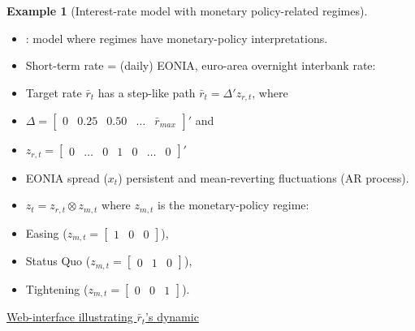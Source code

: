 \documentclass[
  12pt,
]{book}
\providecommand{\tightlist}{%
  \setlength{\itemsep}{0pt}\setlength{\parskip}{0pt}}
\theoremstyle{definition}
\theoremstyle{definition}
\newtheorem{example}{Example}[chapter]
\theoremstyle{definition}
\theoremstyle{definition}
\theoremstyle{remark}
\begin{document}
\begin{example}[Interest-rate model with monetary policy-related regimes]
\protect\hypertarget{exm:RSMP}{}\label{exm:RSMP}\leavevmode

\begin{itemize}
\tightlist
\item
  \citet{Renne_2017}: model where regimes have monetary-policy interpretations.
\item
  Short-term rate = (daily) EONIA, euro-area overnight interbank rate:
\end{itemize}

\begin{center}
\par\end{center}

\begin{itemize}
\tightlist
\item
  Target rate \(\bar{r}_{t}\) has a step-like path \(\bar{r}_{t}=\Delta'z_{r,t}\),
  where
\item
  \(\Delta=[\begin{array}{ccccc} 0 & 0.25 & 0.50 & \ldots & \bar{r}_{max}\end{array}]'\) and
\item
  \(z_{r,t}=[\begin{array}{ccccccc} 0 & \ldots & 0 & 1 & 0 & \ldots & 0\end{array}]'\)
\item
  EONIA spread (\(x_t\)) persistent and mean-reverting fluctuations (AR process).
\item
  \(z_t = z_{r,t}\otimes z_{m,t}\) where \(z_{m,t}\) is the monetary-policy regime:
\item
  Easing (\(z_{m,t}=[\begin{array}{ccc} 1 & 0 & 0\end{array}]\)),
\item
  Status Quo (\(z_{m,t}=[\begin{array}{ccc} 0 & 1 & 0\end{array}]\)),
\item
  Tightening (\(z_{m,t}=[\begin{array}{ccc} 0 & 0 & 1\end{array}]\)).
\end{itemize}

\href{https://fixed-income.shinyapps.io/NLIR/}{Web-interface illustrating \(\bar{r}_t\)'s dynamic}


\end{example}
\end{document}
